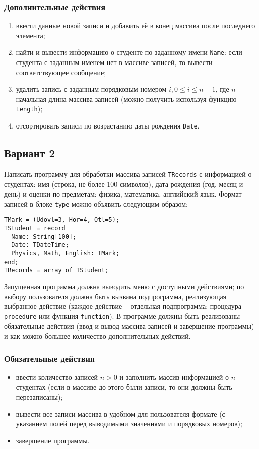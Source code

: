 \documentclass[12pt,a4paper]{report}
\begin{document}
\subsubsection*{Дополнительные действия}
\begin{enumerate}
\item ввести данные новой записи и добавить её в конец массива после последнего элемента;
\item найти и вывести информацию о студенте по заданному имени \texttt{Name}: если студента с заданным именем нет в массиве записей, то вывести соответствующее сообщение;
\item удалить запись с заданным порядковым номером $i, 0 \le i \le n-1$, где $n$ -- начальная длина массива записей (можно получить используя функцию \texttt{Length});
\item отсортировать записи по возрастанию даты рождения \texttt{Date}.
\end{enumerate}



\clearpage
\subsection*{Вариант 2}
Написать программу для обработки массива записей \texttt{TRecords} с информацией о студентах: имя (строка, не более 100 символов), дата рождения (год, месяц и день) и оценки по предметам: физика, математика, английский язык.
Формат записей в блоке \texttt{type} можно объявить следующим образом:
\begin{verbatim}
TMark = (Udovl=3, Hor=4, Otl=5);
TStudent = record
  Name: String[100];
  Date: TDateTime;
  Physics, Math, English: TMark;
end;
TRecords = array of TStudent;
\end{verbatim}

Запущенная программа должна выводить меню с доступными действиями; по выбору пользователя должна быть вызвана подпрограмма, реализующая выбранное действие (каждое действие -- отдельная подпрограмма: процедура \texttt{procedure} или функция \texttt{function}). В программе должны быть реализованы обязательные действия (ввод и вывод массива записей и завершение программы) и как можно большее количество дополнительных действий. 

\subsubsection*{Обязательные действия}
\begin{itemize}
\item ввести количество записей $n > 0$ и заполнить массив информацией о $n$ студентах (если в массиве до этого были записи, то они должны быть перезаписаны);
\item вывести все записи массива в удобном для пользователя формате (с указанием полей перед выводимыми значениями и порядковых номеров);
\item завершение программы.
\end{itemize}
\end{document}
